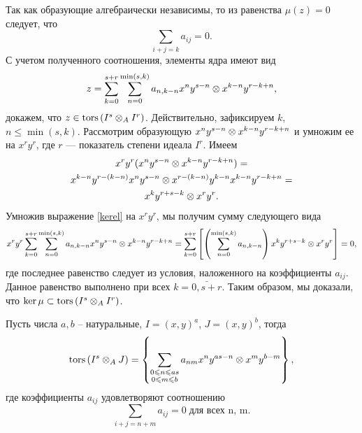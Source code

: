 \begin{Proof}
        Так как образующие алгебраически независимы, то из равенства $\mu(z) = 0$ следует, что
        \begin{equation*}
            \sum_{i + j = k} a_{ij} = 0.
        \end{equation*}
        С учетом полученного соотношения, элементы ядра имеют вид
        \begin{equation} \label{kerel}
            z = \sum_{k=0}^{s + r} \sum_{n = 0}^{\min(s, k)} a_{n,k-n}x^ny^{s - n} \otimes x^{k - n}y^{r - k + n},
        \end{equation}
        докажем, что $z \in \textup{tors}\left(I^s \otimes_A I^r\right)$. Действительно, зафиксируем $k$, $n \leq \min(s, k)$.
        Рассмотрим образующую $x^ny^{s - n} \otimes x^{k - n}y^{r - k + n}$ и умножим ее на 
        $x^ry^r$, где $r$ --- показатель степени идеала $I^r$. Имеем
        \begin{multline*}
            x^ry^r(x^ny^{s - n} \otimes x^{k - n}y^{r - k + n}) = \\
            x^{k - n}y^{r - (k - n)}x^ny^{s - n} \otimes x^{r - (k - n)}y^{k - n}x^{k - n}y^{r - k + n} = \\
            x^ky^{r + s - k} \otimes x^ry^r.
        \end{multline*}
        Умножив выражение \eqref{kerel} на $x^ry^r$,  мы получим сумму следующего вида
        \begin{equation*}
            x^ry^r\sum_{k=0}^{s + r}\sum_{n = 0}^{\min(s, k)} a_{n,k-n}x^ny^{s - n} \otimes x^{k - n}y^{r - k + n} =
            \sum_{k=0}^{s + r} \left[ \left(\sum_{n = 0}^{\min(s, k)}a_{n,k-n}\right)x^ky^{r + s - k} \otimes x^ry^r \right] = 0,
        \end{equation*}
        где последнее равенство следует из условия, наложенного на коэффициенты $a_{ij}$. 
        Данное равенство выполнено при всех $k = \bar{0, s + r}$.
        Таким образом, мы доказали, что $\ker \mu \subset \textup{tors}\left(I^s \otimes_A I^r\right)$.
    \end{Proof}
    \begin{Corollary}
        Пусть числа $a, b$ -- натуральные, $I = (x, y)^a$, $J = (x, y)^b$, тогда
        \begin{equation*}
            \textup{tors}\left(I^s \otimes_A J\right) = 
                \left\{ \sum_{\substack{0 \leqslant n \leqslant as \\ 0 \leqslant m \leqslant b}}a_{nm}x^ny^{as - n} \otimes x^my^{b - m} \right\},
        \end{equation*}
        где коэффициенты $a_{ij}$ удовлетворяют соотношению
        $$\sum_{i + j = n + m} a_{ij} = 0\;\text{для всех n, m}.$$
    \end{Corollary}

